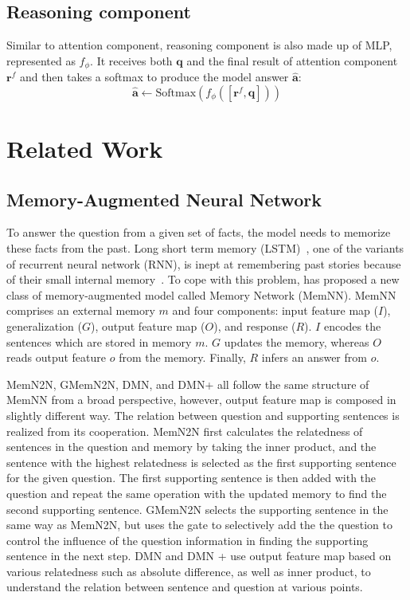 \documentclass{article} \usepackage{iclr2018_conference,times}
\renewcommand{\vec}[1]{\mathbf{#1}}
\begin{document}
\subsection{Reasoning component} 
Similar to attention component, reasoning component is also made up of MLP, represented as $f_\phi$.
It receives both $\vec{q}$ and the final result of attention component $\vec{r}^f$ and then takes a softmax to produce the model answer $\hat{\vec{a}}$:
\begin{equation}
\hat{\vec{a}} \leftarrow \text{Softmax} ( f_\phi ([\vec{r}^f, \vec{q}]))
\end{equation}



\section{Related Work}



\subsection{Memory-Augmented Neural Network}
To answer the question from a given set of facts, the model needs to memorize these facts from the past. 
Long short term memory (LSTM)~\citep{hochreiter1997long}, one of the variants of recurrent neural network (RNN), is inept at remembering past stories because of their small internal memory~\citep{sukhbaatar2015end}. 
To cope with this problem, \citet{Weston15} has proposed a new class of memory-augmented model called Memory Network (MemNN). 
MemNN comprises an external memory $m$ and four components: input feature map ($I$), generalization ($G$), output feature map ($O$), and response ($R$). 
$I$ encodes the sentences which are stored in memory $m$.
$G$ updates the memory, whereas $O$ reads output feature $o$ from the memory.
Finally, $R$ infers an answer from $o$.


MemN2N, GMemN2N, DMN, and DMN+ all follow the same structure of MemNN from a broad perspective, however, output feature map is composed in slightly different way.
The relation between question and supporting sentences is realized from its cooperation.
MemN2N first calculates the relatedness of sentences in the question and memory by taking the inner product, and the sentence with the highest relatedness is selected as the first supporting sentence for the given question.
The first supporting sentence is then added with the question and repeat the same operation with the updated memory to find the second supporting sentence.
GMemN2N selects the supporting sentence in the same way as MemN2N, but uses the gate to selectively add the the question to control the influence of the question information in finding the supporting sentence in the next step.
DMN and DMN + use output feature map based on various relatedness such as absolute difference, as well as inner product, to understand the relation between sentence and question at various points.
\end{document}
